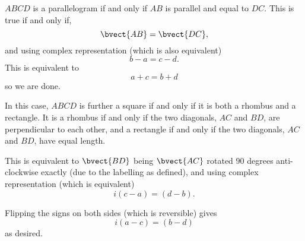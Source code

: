 \Question{\currfilebase}

\(ABCD\) is a parallelogram if and only if \(AB\) is parallel and equal to \(DC\). This is true if and only if,
\[
    \bvect{AB} = \bvect{DC},
\]
and using complex representation (which is also equivalent)
\[
    b - a = c - d.
\]
This is equivalent to
\[
    a + c = b + d
\]
so we are done.

In this case, \(ABCD\) is further a square if and only if it is both a rhombus and a rectangle. It is a rhombus if and only if the two diagonals, \(AC\) and \(BD\), are perpendicular to each other, and a rectangle if and only if the two diagonals, \(AC\) and \(BD\), have equal length.

This is equivalent to \(\bvect{BD}\) being \(\bvect{AC}\) rotated \(90\) degrees anti-clockwise exactly (due to the labelling as defined), and using complex representation (which is equivalent)
\[
    i(c - a) = (d - b).
\]

Flipping the signs on both sides (which is reversible) gives
\[
    i(a - c) = (b - d)
\]
as desired.

